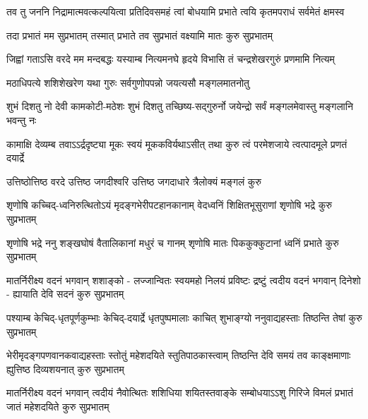 

{तव तु जननि निद्रामात्मवत्कल्पयित्वा}
{प्रतिदिवसमहं त्वां बोधयामि प्रभाते}
{त्वयि कृतमपराधं सर्वमेतं क्षमस्व}

{तदा प्रभातं मम सुप्रभातम्}
{तस्मात् प्रभाते तव सुप्रभातं}
{वक्ष्यामि मातः कुरु सुप्रभातम्}

{जिह्वां गताऽसि वरदे मम मन्दबद्धः}
{यस्याम्ब नित्यमनघे हृदये विभासि}
{तं चन्द्रशेखरगुरुं प्रणमामि नित्यम्}

{मठाधिपत्ये शशिशेखरेण}
{यथा गुरुः सर्वगुणोपपन्नो}
{जयत्यसौ मङ्गलमातनोतु}

{शुभं दिशतु नो देवी कामकोटी-मठेशः}
{शुभं दिशतु तच्छिष्य-सद्गुरुर्नो जयेन्द्रो}
{सर्वं मङ्गलमेवास्तु मङ्गलानि भवन्तु नः}

\fourlineindentedshloka
{कामाक्षि देव्यम्ब तवाऽऽर्द्रदृष्ट्या}
{मूकः स्वयं मूककविर्यथाऽसीत्}
{तथा कुरु त्वं परमेशजाये}
{त्वत्पादमूले प्रणतं दयार्द्रे}

\twolineshloka
{उत्तिष्ठोत्तिष्ठ वरदे उत्तिष्ठ जगदीश्वरि}
{उत्तिष्ठ जगदाधारे त्रैलोक्यं मङ्गलं कुरु}

\fourlineindentedshloka
{शृणोषि कच्चिद्-ध्वनिरुत्थितोऽयं}
{मृदङ्गभेरीपटहानकानाम्}
{वेदध्वनिं शिक्षितभूसुराणां}
{शृणोषि भद्रे कुरु सुप्रभातम्}

\fourlineindentedshloka
{शृणोषि भद्रे ननु शङ्खघोषं}
{वैतालिकानां मधुरं च गानम्}
{शृणोषि मातः पिककुक्कुटानां}
{ध्वनिं प्रभाते कुरु सुप्रभातम्}

\fourlineindentedshloka
{मातर्निरीक्ष्य वदनं भगवान् शशाङ्को -}
{लज्जान्वितः स्वयमहो निलयं प्रविष्टः}
{द्रष्टुं त्वदीय वदनं भगवान् दिनेशो -}
{ह्यायाति देवि सदनं कुरु सुप्रभातम्}

\fourlineindentedshloka
{पश्याम्ब केचिद्-धृतपूर्णकुम्भाः}
{केचिद्-दयार्द्रे धृतपुष्पमालाः}
{काचित् शुभाङ्ग्यो ननुवाद्यहस्ताः}
{तिष्ठन्ति तेषां कुरु सुप्रभातम्}

\fourlineindentedshloka
{भेरीमृदङ्गपणवानकवाद्यहस्ताः}
{स्तोतुं महेशदयिते स्तुतिपाठकास्त्वाम्}
{तिष्ठन्ति देवि समयं तव काङ्क्षमाणाः}
{ह्युत्तिष्ठ दिव्यशयनात् कुरु सुप्रभातम्}

\fourlineindentedshloka
{मातर्निरीक्ष्य वदनं भगवान् त्वदीयं}
{नैवोत्थितः शशिधिया शयितस्तवाङ्के}
{सम्बोधयाऽऽशु गिरिजे विमलं प्रभातं}
{जातं महेशदयिते कुरु सुप्रभातम्}


